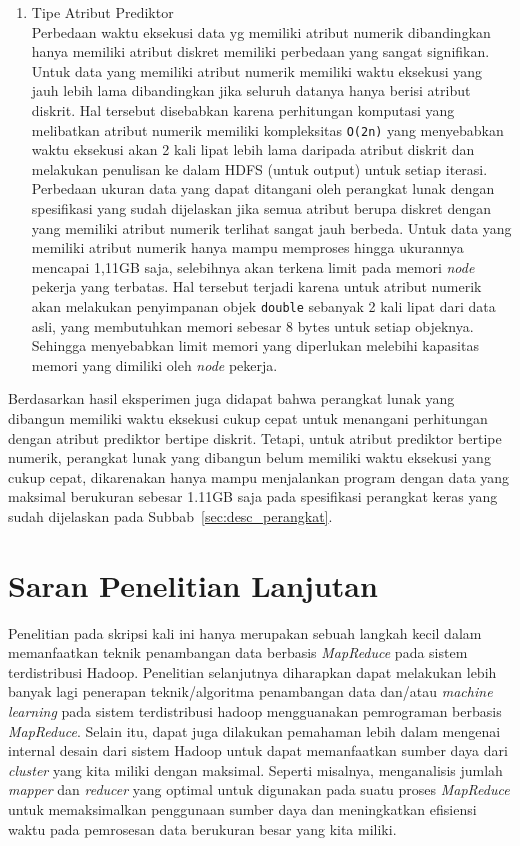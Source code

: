 \begin{itemize}
\begin{enumerate}[label=(\alph*)]
		\item Tipe Atribut Prediktor\\
		Perbedaan waktu eksekusi data yg memiliki atribut numerik dibandingkan hanya memiliki atribut diskret memiliki perbedaan yang sangat signifikan. Untuk data yang memiliki atribut numerik memiliki waktu eksekusi yang jauh lebih lama dibandingkan jika seluruh datanya hanya berisi atribut diskrit. Hal tersebut disebabkan karena perhitungan komputasi yang melibatkan atribut numerik memiliki kompleksitas \verb|O(2n)| yang menyebabkan waktu eksekusi akan 2 kali lipat lebih lama daripada atribut diskrit dan melakukan penulisan ke dalam HDFS (untuk output) untuk setiap iterasi.%
		Perbedaan ukuran data yang dapat ditangani oleh perangkat lunak dengan spesifikasi yang sudah dijelaskan jika semua atribut berupa diskret dengan yang memiliki atribut numerik terlihat sangat jauh berbeda. Untuk data yang memiliki atribut numerik hanya mampu memproses hingga ukurannya mencapai 1,11GB saja, selebihnya akan terkena limit pada memori \textit{node} pekerja yang terbatas. Hal tersebut terjadi karena untuk atribut numerik akan melakukan penyimpanan objek \texttt{double} sebanyak 2 kali lipat dari data asli, yang membutuhkan memori sebesar 8 bytes untuk setiap objeknya. Sehingga menyebabkan limit memori yang diperlukan melebihi kapasitas memori yang dimiliki oleh \textit{node} pekerja.
	\end{enumerate}

	Berdasarkan hasil eksperimen juga didapat bahwa perangkat lunak yang dibangun memiliki waktu eksekusi cukup cepat untuk menangani perhitungan dengan atribut prediktor bertipe diskrit. Tetapi, untuk atribut prediktor bertipe numerik, perangkat lunak yang dibangun belum memiliki waktu eksekusi yang cukup cepat, dikarenakan hanya mampu menjalankan program dengan data yang maksimal berukuran sebesar 1.11GB saja pada spesifikasi perangkat keras yang sudah dijelaskan pada Subbab~\ref{sec:desc_perangkat}.
	
\end{itemize}

\section{Saran Penelitian Lanjutan}

Penelitian pada skripsi kali ini hanya merupakan sebuah langkah kecil dalam memanfaatkan teknik penambangan data berbasis \textit{MapReduce} pada sistem terdistribusi Hadoop. Penelitian selanjutnya diharapkan dapat melakukan lebih banyak lagi penerapan teknik/algoritma penambangan data dan/atau \textit{machine learning} pada sistem terdistribusi hadoop mengguanakan pemrograman berbasis \textit{MapReduce}. Selain itu, dapat juga dilakukan pemahaman lebih dalam mengenai internal desain dari sistem Hadoop untuk dapat memanfaatkan sumber daya dari \textit{cluster} yang kita miliki dengan maksimal. Seperti misalnya, menganalisis jumlah \textit{mapper} dan \textit{reducer} yang optimal untuk digunakan pada suatu proses \textit{MapReduce} untuk memaksimalkan penggunaan sumber daya dan meningkatkan efisiensi waktu pada pemrosesan data berukuran besar yang kita miliki.

